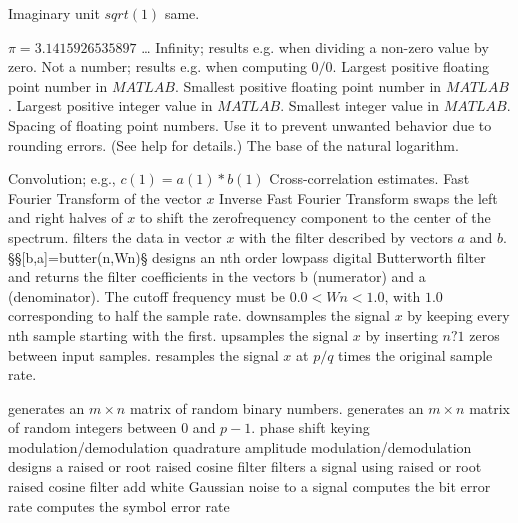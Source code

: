	{Imaginary unit $sqrt(1)$}
	{same.}

	{$\pi = 3.1415926535897$ \ldots}
	{Infinity; results e.g. when dividing a non-zero value by zero.}
	{Not a number; results e.g. when computing $0/0$.}
	{Largest positive floating point number in $MATLAB$.}
	{Smallest positive floating point number in $MATLAB$.}
	{Largest positive integer value in $MATLAB$.}
	{Smallest integer value in $MATLAB$.}
	{Spacing of floating point numbers. Use it to prevent unwanted behavior due to rounding errors. (See help for details.)}
	{The base of the natural logarithm.}

	{Convolution; e.g., $c(1)=a(1)*b(1)$}
	{Cross-correlation estimates.}
	{Fast Fourier Transform of the vector $x$}
	{Inverse Fast Fourier Transform}
	{swaps the left and right halves of $x$ to shift the zerofrequency component to the center of the spectrum.}
	{filters the data in vector $x$ with the filter described by vectors $a$ and $b$.}
§§[b,a]=butter(n,Wn)§ designs an nth order lowpass digital Butterworth filter and returns the filter coefficients in the vectors b (numerator) and a (denominator). The cutoff frequency must be $0.0 < Wn < 1.0$, with $1.0$ corresponding to half the sample rate.
	{downsamples the signal $x$ by keeping every nth sample starting with the first.}
	{upsamples the signal $x$ by inserting $n?1$ zeros between input samples.}
	{resamples the signal $x$ at $p/q$ times the original sample rate.}

	{generates an $m \times n$ matrix of random binary numbers.}
	{generates an $m \times n$ matrix of random integers between $0$ and $p-1$.}
	{phase shift keying modulation/demodulation}
	{quadrature amplitude modulation/demodulation}
	{designs a raised or root raised cosine filter}
	{filters a signal using raised or root raised cosine filter}
	{add white Gaussian noise to a signal}
	{computes the bit error rate}
	{computes the symbol error rate}


